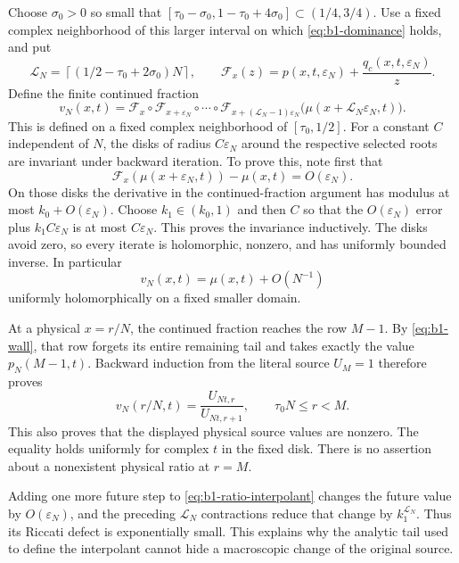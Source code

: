 Choose $\sigma_0>0$ so small that
$[\tau_0-\sigma_0,1-\tau_0+4\sigma_0]\subset(1/4,3/4)$.
Use a fixed complex neighborhood of this larger interval on which
\eqref{eq:b1-dominance} holds, and put
\[
 \mathcal L_N=\left\lceil(1/2-\tau_0+2\sigma_0)N\right\rceil,
 \qquad \mathcal F_x(z)=p(x,t,\varepsilon_N)
                  +\frac{q_c(x,t,\varepsilon_N)}z.
\]
Define the finite continued fraction
\begin{equation}\label{eq:b1-ratio-interpolant}
 v_N(x,t)=\mathcal F_x\circ\mathcal F_{x+\varepsilon_N}\circ
 \cdots\circ\mathcal F_{x+(\mathcal L_N-1)\varepsilon_N}
 \bigl(\mu(x+\mathcal L_N\varepsilon_N,t)\bigr).
\end{equation}
This is defined on a fixed complex neighborhood of $[\tau_0,1/2]$.
For a constant $C$ independent of $N$, the disks of radius
$C\varepsilon_N$ around the respective selected roots are invariant
under backward iteration. To prove this, note first that
\[
 \mathcal F_x(\mu(x+\varepsilon_N,t))-\mu(x,t)
 =O(\varepsilon_N).
\]
On those disks the derivative in the continued-fraction argument has
modulus at most $k_0+O(\varepsilon_N)$. Choose $k_1\in(k_0,1)$ and then
$C$ so that the $O(\varepsilon_N)$ error plus
$k_1C\varepsilon_N$ is at most $C\varepsilon_N$. This proves the
invariance inductively. The disks avoid zero, so every iterate is
holomorphic, nonzero, and has uniformly bounded inverse. In particular
\begin{equation}\label{eq:b1-ratio-leading}
 v_N(x,t)=\mu(x,t)+O(N^{-1})
\end{equation}
uniformly holomorphically on a fixed smaller domain.

At a physical $x=r/N$, the continued fraction reaches the row $M-1$.
By \eqref{eq:b1-wall}, that row forgets its entire remaining tail and
takes exactly the value $p_N(M-1,t)$. Backward induction from the literal
source $U_M=1$ therefore proves
\begin{equation}\label{eq:b1-exact-ratio}
 v_N(r/N,t)=\frac{U_{Nt,r}}{U_{Nt,r+1}},
 \qquad \tau_0N\le r<M.
\end{equation}
This also proves that the displayed physical source values are nonzero.
The equality holds uniformly for complex $t$ in the fixed disk. There is
no assertion about a nonexistent physical ratio at $r=M$.

Adding one more future step to \eqref{eq:b1-ratio-interpolant} changes
the future value by $O(\varepsilon_N)$, and the preceding
$\mathcal L_N$ contractions reduce that change by $k_1^{\mathcal L_N}$.
Thus its Riccati defect is exponentially small. This explains why the
analytic tail used to define the interpolant cannot hide a macroscopic
change of the original source.

